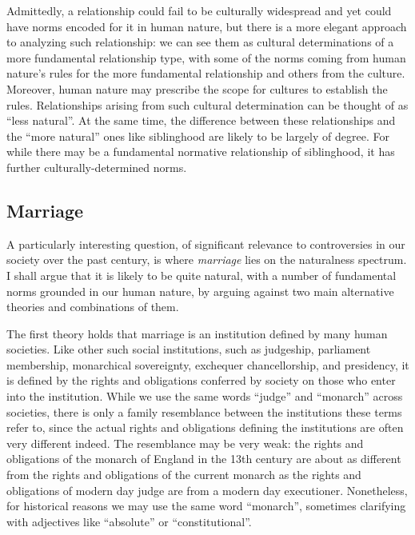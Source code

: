 Admittedly, a relationship could fail to be culturally widespread and yet could have norms encoded for it in human nature, but there is a more elegant approach to
analyzing such relationship: we can see them as cultural determinations of a more fundamental relationship type, with some of the norms coming from human nature's
rules for the more fundamental relationship and others from the culture. Moreover, human nature may prescribe the scope for cultures to establish the rules.
Relationships arising from such cultural determination can be thought of as ``less natural''. At the same time, the difference between these relationships and the ``more natural'' ones like siblinghood
are likely to be largely of degree. For while there may be a fundamental normative relationship of siblinghood, it has further culturally-determined
norms.

\subsection{Marriage}
A particularly interesting question, of significant relevance to controversies in our society over the past century, is where \textit{marriage}
lies on the naturalness spectrum. I shall argue that it is likely to be quite natural, with a number of fundamental norms grounded in our human
nature, by arguing against two main alternative theories and combinations of them.

The first theory holds that marriage is an institution defined by many human societies. Like other such social institutions, such as judgeship, parliament membership,
monarchical sovereignty, exchequer chancellorship, and presidency, it is defined by the rights and obligations conferred by society on those who enter into the institution.
While we use the same words ``judge'' and ``monarch'' across societies, there is only a family resemblance between the institutions these terms refer to, since the actual
rights and obligations defining the institutions are often very different indeed. The resemblance may be very weak: the rights and obligations of the monarch of England
in the 13th century are about as different from the rights and obligations of the current monarch as the rights and obligations of modern day judge are from a modern day
executioner. Nonetheless, for historical reasons we may use the same word ``monarch'', sometimes clarifying with adjectives like ``absolute'' or ``constitutional''.

